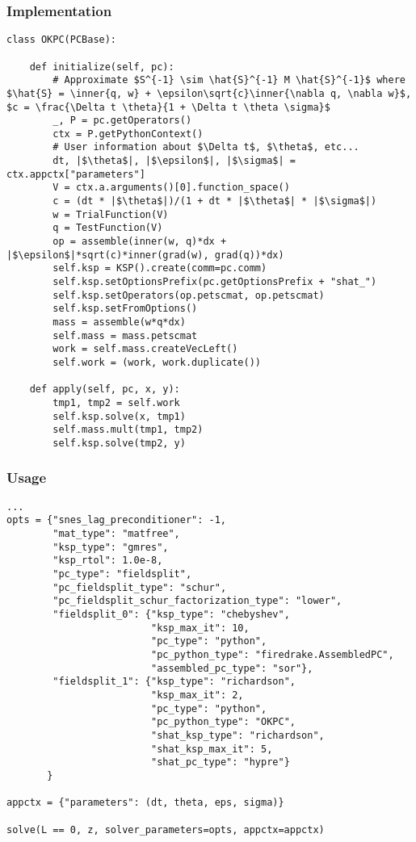 \documentclass[presentation]{beamer}
\newcommand{\inner}[1]{\left\langle #1 \right \rangle}
\begin{document}
\begin{frame}[fragile]
  \frametitle{Implementation}
\begin{verbatim}
class OKPC(PCBase):

    def initialize(self, pc):
        # Approximate $S^{-1} \sim \hat{S}^{-1} M \hat{S}^{-1}$ where $\hat{S} = \inner{q, w} + \epsilon\sqrt{c}\inner{\nabla q, \nabla w}$, $c = \frac{\Delta t \theta}{1 + \Delta t \theta \sigma}$
        _, P = pc.getOperators()
        ctx = P.getPythonContext()
        # User information about $\Delta t$, $\theta$, etc...
        dt, |$\theta$|, |$\epsilon$|, |$\sigma$| = ctx.appctx["parameters"]
        V = ctx.a.arguments()[0].function_space()
        c = (dt * |$\theta$|)/(1 + dt * |$\theta$| * |$\sigma$|)
        w = TrialFunction(V)
        q = TestFunction(V)
        op = assemble(inner(w, q)*dx + |$\epsilon$|*sqrt(c)*inner(grad(w), grad(q))*dx)
        self.ksp = KSP().create(comm=pc.comm)
        self.ksp.setOptionsPrefix(pc.getOptionsPrefix + "shat_")
        self.ksp.setOperators(op.petscmat, op.petscmat)
        self.ksp.setFromOptions()
        mass = assemble(w*q*dx)
        self.mass = mass.petscmat
        work = self.mass.createVecLeft()
        self.work = (work, work.duplicate())

    def apply(self, pc, x, y):
        tmp1, tmp2 = self.work
        self.ksp.solve(x, tmp1)
        self.mass.mult(tmp1, tmp2)
        self.ksp.solve(tmp2, y)
\end{verbatim}
\end{frame}

\begin{frame}[fragile]
  \frametitle{Usage}
\begin{verbatim}
...
opts = {"snes_lag_preconditioner": -1,
        "mat_type": "matfree",
        "ksp_type": "gmres",
        "ksp_rtol": 1.0e-8,
        "pc_type": "fieldsplit",
        "pc_fieldsplit_type": "schur",
        "pc_fieldsplit_schur_factorization_type": "lower",
        "fieldsplit_0": {"ksp_type": "chebyshev",
                         "ksp_max_it": 10,
                         "pc_type": "python",
                         "pc_python_type": "firedrake.AssembledPC",
                         "assembled_pc_type": "sor"},
        "fieldsplit_1": {"ksp_type": "richardson",
                         "ksp_max_it": 2,
                         "pc_type": "python",
                         "pc_python_type": "OKPC",
                         "shat_ksp_type": "richardson",
                         "shat_ksp_max_it": 5,
                         "shat_pc_type": "hypre"}
       }

appctx = {"parameters": (dt, theta, eps, sigma)}

solve(L == 0, z, solver_parameters=opts, appctx=appctx)
\end{verbatim}
\end{frame}
\end{document}
